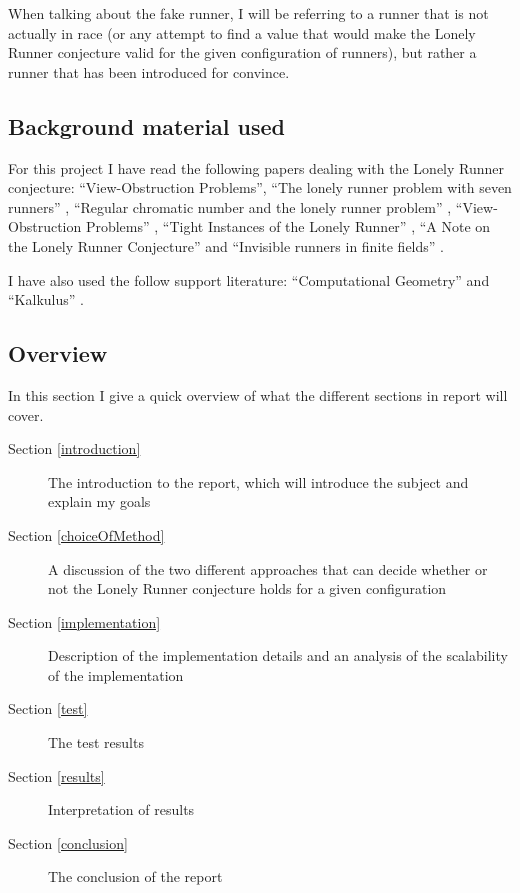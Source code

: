 When talking about the fake runner, I will be referring to a runner that is not actually in race (or any attempt to find a value that would make the Lonely Runner conjecture valid for the given configuration of runners), but rather a runner that has been introduced for convince.   

\subsection{Background material used}
\label{background}
For this project I have read the following papers dealing with the Lonely Runner conjecture: ``View-Obstruction Problems''\cite{Bienia97flows.view-obstructions}, ``The lonely runner problem with seven runners'' \cite{serra_thelonely}, ``Regular chromatic number and the lonely runner problem'' \cite{Barajas2007479}, ``View-Obstruction Problems'' \cite{springerlink:10.1007/BF01832623}, ``Tight Instances of the Lonely Runner'' \cite{Goddyn96tightinstances}, ``A Note on the Lonely Runner Conjecture'' \cite{ANote} and ``Invisible runners in finite fields'' \cite{invis}.

I have also used the follow support literature:
``Computational Geometry'' \cite{citeulike:3347056} and ``Kalkulus'' \cite{kalkulus}.

\subsection{Overview}

In this section I give a quick overview of what the different sections in report will cover.
\begin{description}
\item[Section \ref{introduction}] The introduction to the report, which will introduce the subject and explain my goals
\item[Section \ref{choiceOfMethod}] A discussion of the two different approaches that can decide whether or not the Lonely Runner conjecture holds for a given configuration
\item[Section \ref{implementation}] Description of the implementation details and an analysis of the scalability of the implementation
\item[Section \ref{test}] The test results
\item[Section \ref{results}] Interpretation of results
\item[Section \ref{conclusion}] The conclusion of the report  
\end{description}
